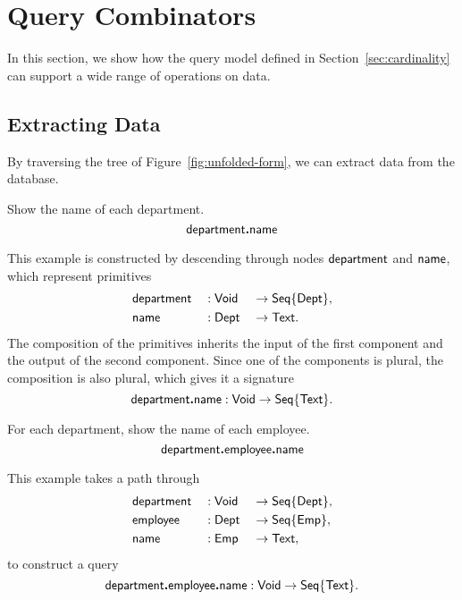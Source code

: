 
\section{Query Combinators}
\label{sec:combinators}

In this section, we show how the query model defined in
Section~\ref{sec:cardinality} can support a wide range of operations on data.

\subsection*{Extracting Data}

By traversing the tree of Figure~\ref{fig:unfolded-form}, we can extract data
from the database.

\begin{demo}
    \label{ex:department-name}
    Show the name of each department.
    \begin{equation*}
        \mathsf{department}\boldsymbol{.}\mathsf{name}
    \end{equation*}
\end{demo}

This example is constructed by descending through nodes $\mathsf{department}$ and
$\mathsf{name}$, which represent primitives
\begin{alignat*}{3}
    & \mathsf{department} && : \mathsf{Void} && \to \mathsf{Seq}{\left\{\mathsf{Dept}\right\}}, \\
    & \mathsf{name} && : \mathsf{Dept} && \to \mathsf{Text}.
\end{alignat*}
The composition of the primitives inherits the input of the first component and
the output of the second component.  Since one of the components is plural, the
composition is also plural, which gives it a signature
\begin{equation*}
    \mathsf{department}\boldsymbol{.}\mathsf{name} : \mathsf{Void} \to \mathsf{Seq}{\left\{\mathsf{Text}\right\}}.
\end{equation*}

\begin{demo}
    \label{ex:department-employee-name}
    For each department, show the name of each employee.
    \begin{equation*}
        \mathsf{department}\boldsymbol{.}\mathsf{employee}\boldsymbol{.}\mathsf{name}
    \end{equation*}
\end{demo}

This example takes a path through
\begin{alignat*}{3}
    & \mathsf{department} && : \mathsf{Void} && \to \mathsf{Seq}{\left\{\mathsf{Dept}\right\}}, \\
    & \mathsf{employee} && : \mathsf{Dept} && \to \mathsf{Seq}{\left\{\mathsf{Emp}\right\}}, \\
    & \mathsf{name} && : \mathsf{Emp} && \to \mathsf{Text},
\end{alignat*}
to construct a query
\begin{equation*}
    \mathsf{department}\boldsymbol{.}\mathsf{employee}\boldsymbol{.}\mathsf{name} : \mathsf{Void} \to \mathsf{Seq}{\left\{\mathsf{Text}\right\}}.
\end{equation*}

